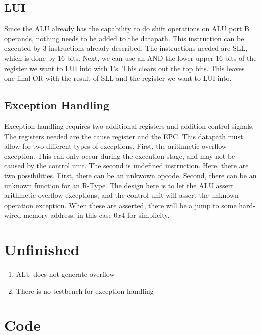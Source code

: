 \documentclass[12pt, a4paper]{article}
\begin{document}
\subsection{LUI}
Since the ALU already has the capability to do shift operations on ALU port B operands, nothing needs to be added to the datapath.
This instruction can be executed by 3 instructions already described. The instructions needed are SLL, which is done by 16 bits. Next,
we can use an AND the lower upper 16 bits of the register we want to LUI into with 1's. This clears out the top bits. This leaves one
final OR with the result of SLL and the register we want to LUI into.

\subsection{Exception Handling}
Exception handling requires two additional registers and addition control signals. The registers needed are the cause register and the EPC.
This datapath must allow for two different types of exceptions. First, the arithmetic overflow exception. This can only occur during the
execution stage, and may not be caused by the control unit. The second is undefined instruction. Here, there are two possibilities. First,
there can be an unkwown opcode. Second, there can be an unknown function for an R-Type. The design here is to let the ALU assert arithmetic
overflow exceptions, and the control unit will assert the unknown operation exception. When these are asserted, there will be a jump to
some hard-wired memory address, in this case $0x4$ for simplicity.


\section{Unfinished}
\begin{enumerate}
  \item ALU does not generate overflow
  \item There is no testbench for exception handling
\end{enumerate}


\appendix
\section{Code}


\lstset{ %
language=VHDL,                %
basicstyle=\footnotesize,
numbers=left,                   %
stepnumber=1,                   %
numbersep=10pt,                  %
showspaces=false,               %
showstringspaces=false,         %
showtabs=false,                 %
frame=shadowbox,	                %
tabsize=2,	                %
captionpos=b,                   %
breaklines=true,                %
breakatwhitespace=false        %
}
\end{document}
